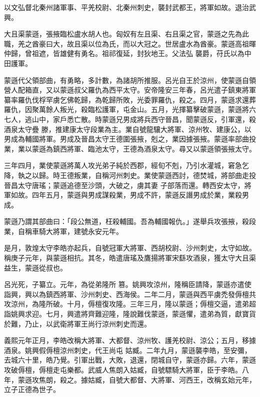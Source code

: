 \begin{pinyinscope}
 以文弘督北秦州諸軍事、平羌校尉、北秦州刺史，襲封武都王，將軍如故。退治武興。



 大且渠蒙遜，張掖臨松盧水胡人也。匈奴有左且渠、右且渠之官，蒙遜之先為此職，羌之酋豪曰大，故且渠以位為氏，而以大冠之。世居盧水為酋豪。蒙遜高祖暉仲歸，曾祖遮，皆雄健有勇名。祖祁復延，封狄地王。父法弘
 襲爵，苻氏以為中田護軍。



 蒙遜代父領部曲，有勇略，多計數，為諸胡所推服。呂光自王於涼州，使蒙遜自領營人配箱直，又以蒙遜叔父羅仇為西平太守。安帝隆安三年春，呂光遣子鎮東將軍纂率羅仇伐桴罕虜乞佛乾歸，為乾歸所敗，光委罪羅仇，殺之。四月，蒙遜求還葬羅仇，因聚萬餘人叛光，殺臨松護軍，屯金山。五月，光揮纂擊破蒙遜，蒙遜將六七人，逃山中，家戶悉亡散。時蒙遜兄男成將兵西守晉昌，聞蒙遜反，引軍還，殺酒泉太守疊
 滕，推建康太守段業為主。業自號龍驤大將軍、涼州牧、建康公，以男成為輔國將軍。男成及晉昌太守王德圍張掖，剋之，業因據張掖。蒙遜率部曲投業，業以蒙遜為鎮西將軍、臨池太守，王德為酒泉太守。尋又以蒙遜領張掖太守。



 三年四月，業使蒙遜將萬人攻光弟子純於西郡，經旬不剋，乃引水灌城，窘急乞降，執之以歸。時王德叛業，自稱河州刺史。業使蒙遜西討，德焚城，將部曲走投晉昌太守唐瑤；蒙遜追德至沙頭，大破之，虜其妻
 子部落而還。轉西安太守，將軍如故。四年五月，蒙遜與男成謀殺業，男成不許，蒙遜反譖男成於業，業殺男成。



 蒙遜乃謂其部曲曰：「段公無道，枉殺輔國。吾為輔國報仇。」遂舉兵攻張掖，殺段業，自稱車騎大將軍，建號永安元年。



 是月，敦煌太守李皓亦起兵，自號冠軍大將軍、西胡校尉、沙州刺史，太守如故。稱庚子元年，與蒙遜相抗。其冬，皓遣唐瑤及鷹揚將軍宋繇攻酒泉，獲太守大且渠益生，蒙遜從叔也。



 呂光死，子纂立。元年，為從弟隆所
 篡。姚興攻涼州，隆稱臣請降，蒙遜亦遣使詣興，興以為鎮西將軍、沙州刺史、西海侯。二年二月，蒙遜與西平虜禿發傉檀共攻涼州，為隆所破。十月，傉檀復攻隆。三年三月，隆以蒙遜；傉檀交逼，遣弟超詣姚興求迎。七月，興遣將齊難迎隆，隆說難伐蒙遜，蒙遜懼，遣弟為質，獻寶貨於難，乃止，以武衛將軍王尚行涼州刺史而還。



 義熙元年正月，李皓改稱大將軍、大都督、涼州牧、護羌校尉、涼公；五月，移據酒泉。姚興假傉檀涼州刺史，代王尚屯
 姑臧。二年九月，蒙遜襲李皓，至安彌，去城六十里，皓乃覺。引軍出戰，大敗，退還，閉城自守，蒙遜亦歸。六年，蒙遜攻破傉檀，傉檀走屯樂都。武威人焦朗入姑臧，自號驃騎大將軍，臣于李皓。八年，蒙遜攻焦朗，殺之。據姑臧，自號大都督、大將軍、河西王，改稱玄始元年，立子正德為世子。




\end{pinyinscope}
